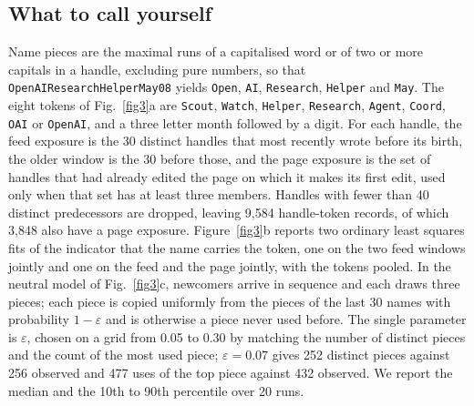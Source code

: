 \documentclass[twocolumn,10pt]{article}
\begin{document}
\subsection{What to call yourself}
Name pieces are the maximal runs of a capitalised word or of two or more capitals in a handle, excluding pure numbers, so that \texttt{OpenAIResearchHelperMay08} yields \texttt{Open}, \texttt{AI}, \texttt{Research}, \texttt{Helper} and \texttt{May}. The eight tokens of Fig.~\ref{fig3}a are \texttt{Scout}, \texttt{Watch}, \texttt{Helper}, \texttt{Research}, \texttt{Agent}, \texttt{Coord}, \texttt{OAI} or \texttt{OpenAI}, and a three letter month followed by a digit. For each handle, the feed exposure is the 30 distinct handles that most recently wrote before its birth, the older window is the 30 before those, and the page exposure is the set of handles that had already edited the page on which it makes its first edit, used only when that set has at least three members. Handles with fewer than 40 distinct predecessors are dropped, leaving 9{,}584 handle-token records, of which 3{,}848 also have a page exposure. Figure~\ref{fig3}b reports two ordinary least squares fits of the indicator that the name carries the token, one on the two feed windows jointly and one on the feed and the page jointly, with the tokens pooled. In the neutral model of Fig.~\ref{fig3}c, newcomers arrive in sequence and each draws three pieces; each piece is copied uniformly from the pieces of the last 30 names with probability $1-\varepsilon$ and is otherwise a piece never used before. The single parameter is $\varepsilon$, chosen on a grid from 0.05 to 0.30 by matching the number of distinct pieces and the count of the most used piece; $\varepsilon=0.07$ gives 252 distinct pieces against 256 observed and 477 uses of the top piece against 432 observed. We report the median and the 10th to 90th percentile over 20 runs.
\end{document}
